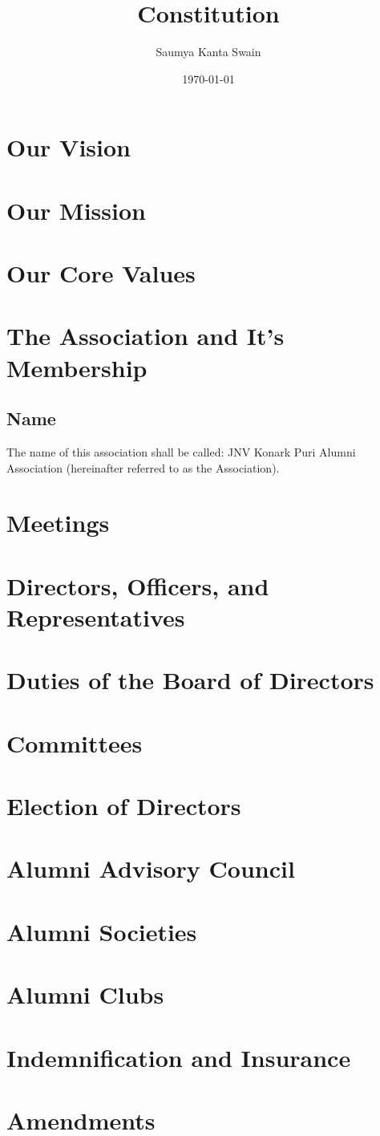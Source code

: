 \documentclass[a4paper,11pt]{book}
\title{Constitution}
\author{Saumya Kanta Swain}
\date{\today}
\begin{document}
\maketitle
\tableofcontents

\chapter*{Our Vision}
\chapter*{Our Mission}
\chapter*{Our Core Values}
\chapter{The Association and It's Membership}
\section{Name}
The name of this association shall be called: JNV Konark Puri Alumni Association (hereinafter referred to as the Association).
\chapter{Meetings}
\chapter{Directors, Officers, and Representatives}
\chapter{Duties of the Board of Directors}
\chapter{Committees}
\chapter{Election of Directors}
\chapter{Alumni Advisory Council}
\chapter{ Alumni Societies }
\chapter{ Alumni Clubs }
\chapter{ Indemnification and Insurance}
\chapter{ Amendments }
\end{document}
